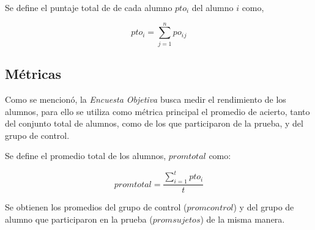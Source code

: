 Se define el puntaje total de de cada alumno $pto_i$ del alumno $i$ como, 

\begin{equation*}
    pto_i = \sum_{j=1}^n{po_i{_j}}
\end{equation*}


\subsection{Métricas}

Como se mencionó, la \emph{Encuesta Objetiva} busca medir el rendimiento de los 
alumnos, para ello se utiliza como métrica principal el promedio de acierto, 
tanto del conjunto total de alumnos, como de los que participaron de la
prueba, y del grupo de control.

Se define el promedio total de los alumnos, $promtotal$ como:

\begin{equation*}
    promtotal = \frac{\sum_{i=1}^t{pto_i}}{t}
\end{equation*}

Se obtienen los promedios del grupo de control ($promcontrol$) y del grupo de alumno que
participaron en la prueba ($promsujetos$) de la misma manera.